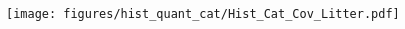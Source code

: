\begin{multicols}{3}
    \begin{minipage}{\columnwidth}
        \begin{figure}[H]
            \hspace{0.8cm}\centering
            \texttt{[image: figures/hist\_quant\_cat/Hist\_Cat\_Cov\_Litter.pdf]}
        \end{figure} 
    \end{minipage}
    
    
\end{multicols}
